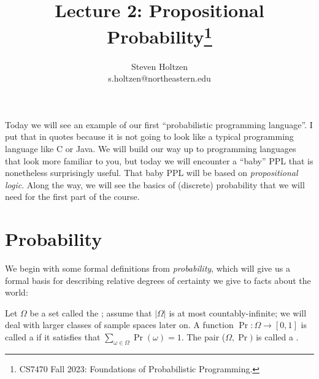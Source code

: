 \documentclass{tufte-handout}
\title{Lecture 2: Propositional Probability\thanks{CS7470 Fall 2023: Foundations of Probabilistic Programming.}}
\author[]{Steven Holtzen\\s.holtzen@northeastern.edu}
\begin{document}
\maketitle%



Today we will see an example of our first ``probabilistic programming
language''. I put that in quotes because it is not going to look like a typical
programming language like C or Java. We will build our way up to programming
languages that look more familiar to you, but today we will encounter a ``baby''
PPL that is nonetheless surprisingly useful. That baby PPL will be based on
\emph{propositional logic}. Along the way, we will see the basics of
(discrete) probability that we will need for the first part of the course.

\section{Probability}
We begin with some formal definitions from \emph{probability}, which will give us a formal basis 
for describing relative degrees of certainty we give to facts about the world:
\begin{definition}
    Let $\Omega$ be a set called the ; assume that $|\Omega|$ is at most 
    countably-infinite; we will deal with larger classes of sample spaces later on.
    A function $\Pr : \Omega \rightarrow [0,1]$ is called a  
    if it satisfies that $\sum_{\omega \in \Omega} \Pr(\omega) = 1$.
    The pair ($\Omega, \Pr)$ is called a .
\end{definition}
\end{document}
